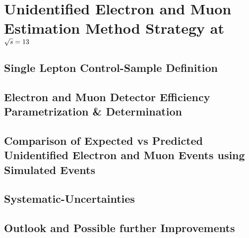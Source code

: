 \section{Unidentified Electron and Muon Estimation Method Strategy at $\sqrt{s}=13$ \tev}
\label{sec:Lost_Lepton_13TeV_changes}
\subsection{Single Lepton Control-Sample Definition}
\label{sec:Lost_Lepton_13TeV_control_sample}
\subsection{Electron and Muon Detector Efficiency Parametrization \& Determination}
\label{sec:Lost_Lepton_13TeV_Efficiencies}
\subsection{Comparison of Expected vs Predicted Unidentified Electron and Muon Events using Simulated Events}
\label{sec:Lost_Lepton_13TeV_Closure}
\subsection{Systematic-Uncertainties}
\label{sec:Lost_Lepton_13TeV_Uncertainties}
\subsection{Outlook and Possible further Improvements}
\label{sec:Lost_Lepton_13TeV_Outlook}







